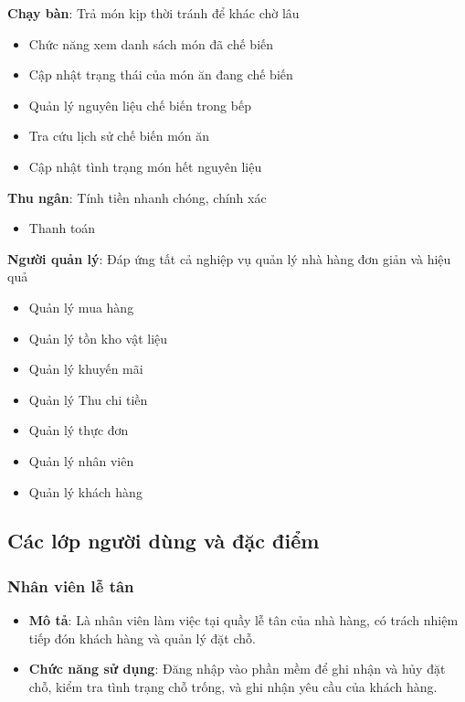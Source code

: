 \textbf{Chạy bàn}: Trả món kịp thời tránh để khác chờ lâu
\begin{itemize}[leftmargin=1.5cm, label={--}]
    \item Chức năng xem danh sách món đã chế biến
    \item Cập nhật trạng thái của món ăn đang chế biến
    \item Quản lý nguyên liệu chế biến trong bếp
    \item Tra cứu lịch sử chế biến món ăn
    \item Cập nhật tình trạng món hết nguyên liệu
\end{itemize}

\textbf{Thu ngân}: Tính tiền nhanh chóng, chính xác
\begin{itemize}[leftmargin=1.5cm, label={--}]
    \item Thanh toán
\end{itemize}

\textbf{Người quản lý}: Đáp ứng tất cả nghiệp vụ quản lý nhà hàng đơn giản và hiệu quả
\begin{itemize}[leftmargin=1.5cm, label={--}]
    \item Quản lý mua hàng
    \item Quản lý tồn kho vật liệu
    \item Quản lý khuyến mãi
    \item Quản lý Thu chi tiền
    \item Quản lý thực đơn
    \item Quản lý nhân viên
    \item Quản lý khách hàng
\end{itemize}


\subsection{Các lớp người dùng và đặc điểm}
\vspace{0.5em}
\subsubsection{Nhân viên lễ tân}
\begin{itemize}[leftmargin=1.5cm, label={--}]
    \item \textbf{Mô tả}: Là nhân viên làm việc tại quầy lễ tân của nhà hàng, có trách nhiệm tiếp đón khách hàng và quản lý đặt chỗ.
    \item \textbf{Chức năng sử dụng}: Đăng nhập vào phần mềm để ghi nhận và hủy đặt chỗ, kiểm tra tình trạng chỗ trống, và ghi nhận yêu cầu của khách hàng.
\end{itemize}


